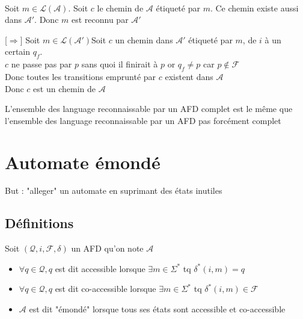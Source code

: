 \begin{dem}
    \\
		[$\Leftarrow$] Soit $m\in\mathcal{L}(\mathcal{A})$. Soit $c$ le chemin de $\mathcal{A}$ étiqueté par
    $m$. Ce chemin existe aussi dans $\mathcal{A}'$. Donc $m$ est reconnu par $\mathcal{A}'$

    [$\Rightarrow$] Soit $m\in\mathcal{L}(\mathcal{A}')$Soit $c$ un chemin dans $\mathcal{A}'$ étiqueté par $m$, de
    $i$ à un certain $q_f$.\\
    
    $c$ ne passe pas par $p$ sans quoi il finirait à $p$ or $q_f\not= p$ car $p\not\in \mathcal{F}$\\
    Donc toutes les transitions emprunté par $c$ existent dans $\mathcal{A}$\\
    Donc $c$ est un chemin de $\mathcal{A}$
\end{dem}

\begin{cor}
    L'ensemble des language reconnaissable par un AFD complet est le même que l'ensemble des language reconnaissable par un AFD pas forcément complet
\end{cor}

\section{Automate émondé}

But : "alleger" un automate en suprimant des états inutiles

\subsection{Définitions}

\begin{definition}
    Soit $(\mathcal{Q},i,\mathcal{F},\delta)$ un AFD qu'on note $\mathcal{A}$\\
    \begin{itemize}
        \item $\forall q \in \mathcal{Q}, q$ est dit accessible lorsque $\exists m \in \Sigma^*$ tq $\delta^*(i,m)=q$
        \item $\forall q \in \mathcal{Q}, q$ est dit co-accessible lorsque $\exists m \in \Sigma^*$ tq $\delta^*(i,m) \in \mathcal{F}$
        \item $\mathcal{A}$ est dit "émondé" lorsque tous ses états sont accessible et co-accessible
    \end{itemize}
\end{definition}

